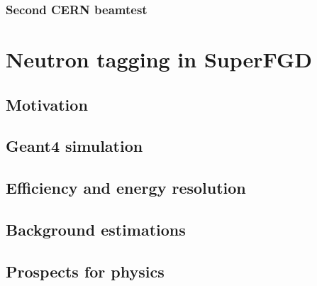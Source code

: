 \documentclass[main.tex]{subfiles}
\begin{document}
\subsection{Second CERN beamtest}

\chapter{Neutron tagging in SuperFGD}
\label{ch:up:neutron}
\section{Motivation}
\section{Geant4 simulation}
\section{Efficiency and energy resolution}
\section{Background estimations}
\section{Prospects for physics}
\end{document}
